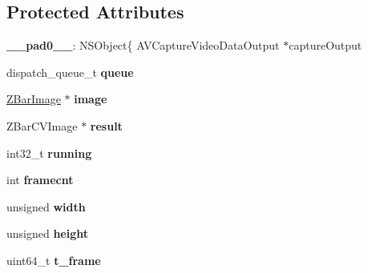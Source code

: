 \subsection*{Protected Attributes}
\begin{DoxyCompactItemize}
\item 
\hypertarget{interface_z_bar_capture_reader_a4962ce748c54f2661e2059ff91d6f6ac}{
{\bfseries \_\-\_\-pad0\_\-\_\-}: NSObject\{ AVCaptureVideoDataOutput $\ast$captureOutput}
\label{interface_z_bar_capture_reader_a4962ce748c54f2661e2059ff91d6f6ac}

\item 
\hypertarget{interface_z_bar_capture_reader_a1fa348b4fdd48ec635c85f05fa0b5498}{
dispatch\_\-queue\_\-t {\bfseries queue}}
\label{interface_z_bar_capture_reader_a1fa348b4fdd48ec635c85f05fa0b5498}

\item 
\hypertarget{interface_z_bar_capture_reader_a3f83653a2729601b5aaba8137096eb8c}{
\hyperlink{interface_z_bar_image}{ZBarImage} $\ast$ {\bfseries image}}
\label{interface_z_bar_capture_reader_a3f83653a2729601b5aaba8137096eb8c}

\item 
\hypertarget{interface_z_bar_capture_reader_a9cced9bace65f7fd289cd903f0d80404}{
ZBarCVImage $\ast$ {\bfseries result}}
\label{interface_z_bar_capture_reader_a9cced9bace65f7fd289cd903f0d80404}

\item 
\hypertarget{interface_z_bar_capture_reader_ac5d290788ea135ddfe71fe974a02e53d}{
int32\_\-t {\bfseries running}}
\label{interface_z_bar_capture_reader_ac5d290788ea135ddfe71fe974a02e53d}

\item 
\hypertarget{interface_z_bar_capture_reader_a377e8adc90d4f3ea9f06214f4fc132ad}{
int {\bfseries framecnt}}
\label{interface_z_bar_capture_reader_a377e8adc90d4f3ea9f06214f4fc132ad}

\item 
\hypertarget{interface_z_bar_capture_reader_a11e98d480fd77e5bed3e88826c8efe7f}{
unsigned {\bfseries width}}
\label{interface_z_bar_capture_reader_a11e98d480fd77e5bed3e88826c8efe7f}

\item 
\hypertarget{interface_z_bar_capture_reader_a09a6d3ebfd7c9d77efeea55be731f625}{
unsigned {\bfseries height}}
\label{interface_z_bar_capture_reader_a09a6d3ebfd7c9d77efeea55be731f625}

\item 
\hypertarget{interface_z_bar_capture_reader_a5070b18c058f91d15d9630ae3db16242}{
uint64\_\-t {\bfseries t\_\-frame}}
\label{interface_z_bar_capture_reader_a5070b18c058f91d15d9630ae3db16242}


\end{DoxyCompactItemize}
